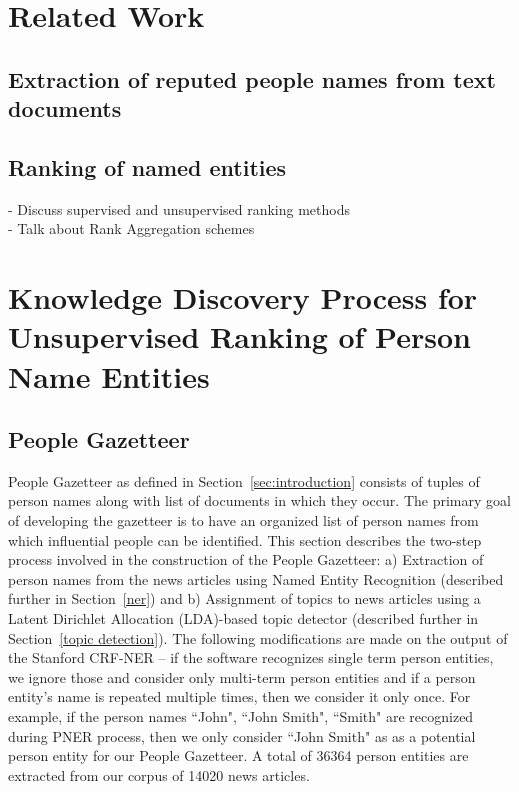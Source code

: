 \documentclass[a4paper,man,natbib]{apa6}
\begin{document}
\section{Related Work}

\subsection{Extraction of reputed people names from text documents}
\subsection{Ranking of named entities}
- Discuss supervised and unsupervised ranking methods \\
- Talk about Rank Aggregation schemes \\



\section{Knowledge Discovery Process for Unsupervised Ranking of Person Name Entities}

\subsection{People Gazetteer}
People Gazetteer as defined in Section~\ref{sec:introduction} consists of tuples of person names along with list of documents in which they occur. The primary goal of developing the gazetteer is to have an organized list of person names from which influential people can be identified.
This section describes the two-step process involved in the construction of the People Gazetteer:
a) Extraction of person names from the news articles using Named Entity Recognition (described further in Section~\ref{ner}) and
b) Assignment of topics to news articles using a Latent Dirichlet Allocation (LDA)-based topic detector (described further in  Section~\ref{topic detection}). The following modifications are made on the output of the Stanford CRF-NER -- if the software recognizes single term person entities, we ignore those and consider only multi-term person entities and if a person entity's name is repeated multiple times, then we consider it only once. For example, if the person names ``John", ``John Smith", ``Smith" are recognized during PNER process, then we only consider ``John Smith" as as a potential person entity for our People Gazetteer.  
A total of 36364 person entities are extracted from our corpus of 14020 news articles.  
\end{document}
